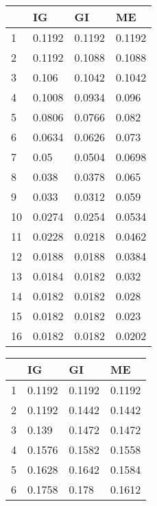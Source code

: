 \documentclass[12pt, fullpage,letterpaper]{article}
\begin{document}
\begin{enumerate}
\begin{enumerate}
	\begin{tabular}{|l|l|l|l|}
		\hline
		& IG & GI & ME \\ \hline
		1  & 0.1192           & 0.1192     & 0.1192         \\ \hline
		2  & 0.1192           & 0.1088     & 0.1088         \\ \hline
		3  & 0.106            & 0.1042     & 0.1042         \\ \hline
		4  & 0.1008           & 0.0934     & 0.096          \\ \hline
		5  & 0.0806           & 0.0766     & 0.082          \\ \hline
		6  & 0.0634           & 0.0626     & 0.073          \\ \hline
		7  & 0.05             & 0.0504     & 0.0698         \\ \hline
		8  & 0.038            & 0.0378     & 0.065          \\ \hline
		9  & 0.033            & 0.0312     & 0.059          \\ \hline
		10 & 0.0274           & 0.0254     & 0.0534         \\ \hline
		11 & 0.0228           & 0.0218     & 0.0462         \\ \hline
		12 & 0.0188           & 0.0188     & 0.0384         \\ \hline
		13 & 0.0184           & 0.0182     & 0.032          \\ \hline
		14 & 0.0182           & 0.0182     & 0.028          \\ \hline
		15 & 0.0182           & 0.0182     & 0.023          \\ \hline
		16 & 0.0182           & 0.0182     & 0.0202         \\ \hline
		\end{tabular}
		\begin{tabular}{|l|l|l|l|}
			\hline
			& IG & GI & ME \\ \hline
			1  & 0.1192           & 0.1192     & 0.1192         \\ \hline
			2  & 0.1192           & 0.1442     & 0.1442         \\ \hline
			3  & 0.139            & 0.1472     & 0.1472         \\ \hline
			4  & 0.1576           & 0.1582     & 0.1558         \\ \hline
			5  & 0.1628           & 0.1642     & 0.1584         \\ \hline
			6  & 0.1758           & 0.178      & 0.1612         \\ \hline

\end{tabular}
\end{enumerate}
\end{enumerate}
\end{document}
